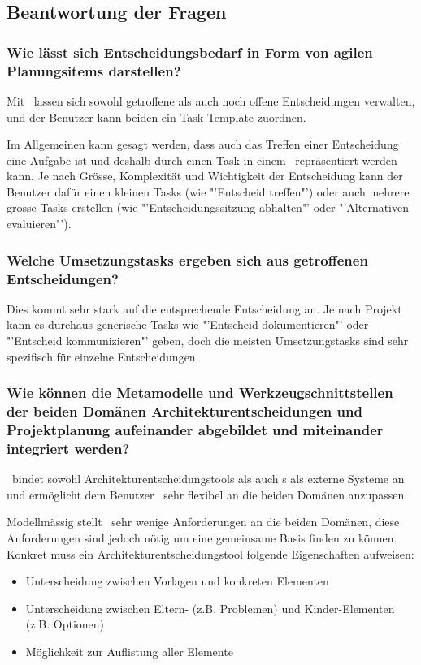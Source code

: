 	\subsection{Beantwortung der Fragen}
		\subsubsection{Wie lässt sich Entscheidungsbedarf in Form von agilen Planungsitems darstellen?}
			Mit \eeppi\ lassen sich sowohl getroffene als auch noch offene Entscheidungen verwalten,
			und der Benutzer kann beiden ein Task-Template zuordnen.
			
			Im Allgemeinen kann gesagt werden,
			dass auch das Treffen einer Entscheidung eine Aufgabe ist
			und deshalb durch einen Task in einem \ppt\ repräsentiert werden kann.
			Je nach Grösse, Komplexität und Wichtigkeit der Entscheidung kann der Benutzer dafür einen kleinen Tasks (wie "'Entscheid treffen"') oder auch mehrere grosse Tasks erstellen (wie "'Entscheidungssitzung abhalten"' oder "'Alternativen evaluieren"').

		\subsubsection{Welche Umsetzungstasks ergeben sich aus getroffenen Entscheidungen?}
			Dies kommt sehr stark auf die entsprechende Entscheidung an.
			Je nach Projekt kann es durchaus generische Tasks wie "'Entscheid dokumentieren"' oder "'Entscheid kommunizieren"' geben,
			doch die meisten Umsetzungstasks sind sehr spezifisch für einzelne Entscheidungen.
		
		\subsubsection{Wie können die Metamodelle und Werkzeugschnittstellen der beiden Domänen Architekturentscheidungen und Projektplanung aufeinander abgebildet und miteinander integriert werden?}
			\eeppi\ bindet sowohl Architekturentscheidungstools als auch \ppt s als externe Systeme an
			und ermöglicht dem Benutzer \eeppi\ sehr flexibel an die beiden Domänen anzupassen.
			
			Modellmässig stellt \eeppi\ sehr wenige Anforderungen an die beiden Domänen,
			diese Anforderungen sind jedoch nötig um eine gemeinsame Basis finden zu können.
			Konkret muss ein Architekturentscheidungstool folgende Eigenschaften aufweisen:
			\begin{itemize}
				\item{Unterscheidung zwischen Vorlagen und konkreten Elementen}
				\item{Unterscheidung zwischen Eltern- (z.B. Problemen) und Kinder-Elementen (z.B. Optionen)}
				\item{Möglichkeit zur Auflistung aller Elemente}
			\end{itemize}
			
